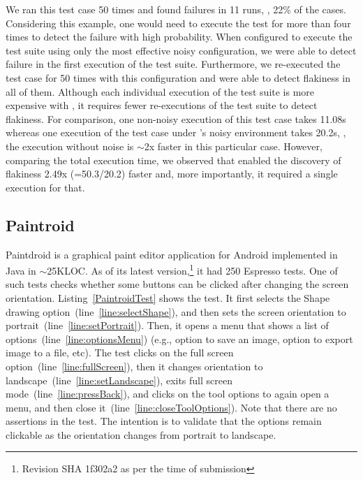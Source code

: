 \documentclass[conference]{IEEEtran}
\begin{document}
We ran this test case 50 times and found failures in 11 runs, \ie{}, 22\% of the cases. Considering this example, one would need to execute the test for more than four times to detect the failure with high probability. When configured to execute the test suite using only the most effective noisy \tname{} configuration, we were able to detect failure in the first execution of the test suite. Furthermore, we re-executed the test case for 50 times with this configuration and were able to detect flakiness in all of them. Although each individual execution of the test suite is more expensive with \tname, it requires fewer re-executions of the test suite to detect flakiness. For comparison, one non-noisy execution of this test case takes 11.08s whereas one execution of the test case under \tname{}'s noisy environment takes 20.2s, \ie{}, the execution without noise is $\sim$2x faster in this particular case. However, comparing the total execution time, we observed that \tname{} enabled the discovery of flakiness 2.49x (=50.3/20.2) faster and, more importantly, it required a single execution for that.

\subsection{Paintroid}

\sloppy
Paintdroid is a graphical paint editor application for Android implemented in Java in $\sim$25KLOC. As of its latest version,\footnote{Revision SHA 1f302a2 as per the time of submission} it had 250 Espresso tests. One of such tests 
checks whether some buttons can be clicked after changing the screen orientation. Listing~\ref{PaintroidTest} shows the test. It first selects the Shape drawing option~(line~\ref{line:selectShape}), and then sets the screen orientation to portrait~(line~\ref{line:setPortrait}). Then, it opens a menu that shows a list of options~(line~\ref{line:optionsMenu}) (e.g., option to save an image, option to export image to a file, etc). The test clicks on the full screen option~(line~\ref{line:fullScreen}), then it changes orientation to landscape~(line~\ref{line:setLandscape}), exits full screen mode~(line~\ref{line:pressBack}), and clicks on the tool options to again open a menu, and then close it~(line~\ref{line:closeToolOptions}). Note that there are no assertions in the test. The intention is to validate that the options remain clickable as the orientation changes from portrait to landscape.
\end{document}
